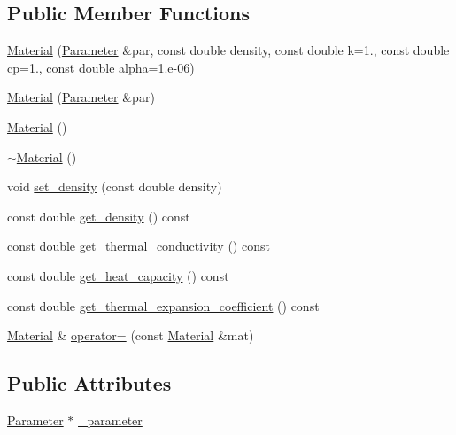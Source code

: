 \subsection*{Public Member Functions}
\begin{DoxyCompactItemize}
\item 
\mbox{\hyperlink{classfemus_1_1_material_a28b5c9b3bfa76ee8fc04c80ef6d59fd8}{Material}} (\mbox{\hyperlink{classfemus_1_1_parameter}{Parameter}} \&par, const double density, const double k=1., const double cp=1., const double alpha=1.e-\/06)
\item 
\mbox{\hyperlink{classfemus_1_1_material_a47fd64055827786a10ef566fdd78bcad}{Material}} (\mbox{\hyperlink{classfemus_1_1_parameter}{Parameter}} \&par)
\item 
\mbox{\hyperlink{classfemus_1_1_material_ab03f94c9212972d69c0ffe90b39df180}{Material}} ()
\item 
\mbox{\hyperlink{classfemus_1_1_material_a763f14720f37ae524e211928901a4827}{$\sim$\+Material}} ()
\item 
void \mbox{\hyperlink{classfemus_1_1_material_a69346301301244f041f7294c293c95a5}{set\+\_\+density}} (const double density)
\item 
const double \mbox{\hyperlink{classfemus_1_1_material_aa1968d4c8018a8fca33acb32a5be3dbc}{get\+\_\+density}} () const
\item 
const double \mbox{\hyperlink{classfemus_1_1_material_aab223129ecb0a391df9583be9f76753e}{get\+\_\+thermal\+\_\+conductivity}} () const
\item 
const double \mbox{\hyperlink{classfemus_1_1_material_a1b86d55f64d65b67ab422b62fb5e17e1}{get\+\_\+heat\+\_\+capacity}} () const
\item 
const double \mbox{\hyperlink{classfemus_1_1_material_a7bd333c73a04e3e85e733a1329facda3}{get\+\_\+thermal\+\_\+expansion\+\_\+coefficient}} () const
\item 
\mbox{\hyperlink{classfemus_1_1_material}{Material}} \& \mbox{\hyperlink{classfemus_1_1_material_aa0f3066f8944ccbbd003fc633de9280b}{operator=}} (const \mbox{\hyperlink{classfemus_1_1_material}{Material}} \&mat)
\end{DoxyCompactItemize}
\subsection*{Public Attributes}
\begin{DoxyCompactItemize}
\item 
\mbox{\hyperlink{classfemus_1_1_parameter}{Parameter}} $\ast$ \mbox{\hyperlink{classfemus_1_1_material_a393992ac63eb6eaae7d5cbad9c6ac4ec}{\+\_\+parameter}}
\end{DoxyCompactItemize}
